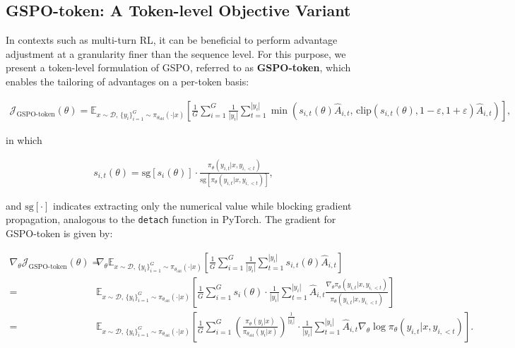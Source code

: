\subsection{GSPO-token: A Token-level Objective Variant}

In contexts such as multi-turn RL, it can be beneficial to perform advantage adjustment at a granularity finer than the sequence level. For this purpose, we present a token-level formulation of GSPO, referred to as \textbf{GSPO-token}, which enables the tailoring of advantages on a per-token basis:

\begin{align}
\mathcal{J}_\text{GSPO-token}(\theta)
=
\mathbb{E}_{ x \sim \mathcal{D},\, \{y_i\}_{i=1}^G \sim \pi_{\theta_\text{old}}( \cdot | x) }
\left[ 
\frac{1}{G} \sum_{i=1}^{G} \frac{1}{|y_i|} \sum_{t=1}^{|y_i|} 
\min \left( s_{i,t}(\theta) \widehat{A}_{i,t},  \, \mathrm{clip} \left( s_{i,t}(\theta), 1 - {\varepsilon}, 1 + {\varepsilon} \right) \widehat{A}_{i,t} \right) 
\right],
\label{equ:gspo-token}
\end{align}

in which

\begin{align}
s_{i,t}(\theta) 
= \mathrm{sg} \left[ s_{i}(\theta) \right]  \cdot \frac{ \pi_{\theta} (y_{i,t} | x, y_{i,<t}) }{ \mathrm{sg} \left[ \pi_{\theta} (y_{i,t} | x, y_{i,<t}) \right] },
\end{align}

and $\mathrm{sg}[\cdot]$ indicates extracting only the numerical value while blocking gradient propagation, analogous to the \texttt{detach} function in PyTorch. The gradient for GSPO-token is given by:

\begin{align}
\nabla_{\theta} \mathcal{J}_\text{GSPO-token}(\theta)
=&\ 
\nabla_{\theta} \mathbb{E}_{ x \sim \mathcal{D},\, \{y_i\}_{i=1}^G \sim \pi_{\theta_\text{old}}( \cdot | x) }
\left[ 
\frac{1}{G} \sum_{i=1}^{G}
\frac{1}{|y_i|} \sum_{t=1}^{|y_i|} 
s_{i,t}(\theta) \widehat{A}_{i,t}
\right] \\
=&\ 
\mathbb{E}_{ x \sim \mathcal{D},\, \{y_i\}_{i=1}^G \sim \pi_{\theta_\text{old}}( \cdot | x) }
\left[ 
\frac{1}{G} \sum_{i=1}^{G} s_i (\theta) \cdot \frac{1}{|y_i|} \sum_{t=1}^{|y_i|} 
\widehat{A}_{i,t} \frac{ \nabla_{\theta} \pi_{\theta} (y_{i,t} | x, y_{i,<t}) }{ \pi_{\theta} (y_{i,t} | x, y_{i,<t}) }
\right] \\
=&\ 
\mathbb{E}_{ x \sim \mathcal{D},\, \{y_i\}_{i=1}^G \sim \pi_{\theta_\text{old}}( \cdot | x) }
\left[ 
\frac{1}{G} \sum_{i=1}^{G}  \left( \frac{ \pi_{\theta} (y_i | x) }{ \pi_{\theta_\text{old}} (y_i | x)} \right)^{\frac{1}{|y_i|}}
\cdot \frac{1}{|y_i|} \sum_{t=1}^{|y_i|}
\widehat{A}_{i,t} \nabla_{\theta} \log \pi_{\theta} (y_{i,t} | x, y_{i,<t})  
\right].
\label{equ:gspo-token_grad}
\end{align}

